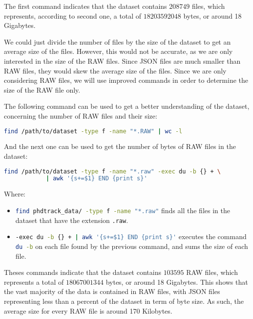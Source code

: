     The first command indicates that the dataset contains $ 208749 $ files, which represents, according to second one, a total of $ 18203592048 $ bytes, or around 18 Gigabytes.

    We could just divide the number of files by the size of the dataset to get an average size of the files. However, this would not be accurate, as we are only interested in the size of the RAW files. Since JSON files are much smaller than RAW files, they would skew the average size of the files. Since we are only considering RAW files, we will use improved commands in order to determine the size of the RAW file only.

    The following command can be used to get a better understanding of the dataset, concerning the number of RAW files and their size:

    \begin{lstlisting}[caption={Find the number of RAW files in the dataset}, language=bash]
        find /path/to/dataset -type f -name "*.RAW" | wc -l
    \end{lstlisting}

    And the next one can be used to get the number of bytes of RAW files in the dataset:

    \begin{lstlisting}[caption={Find the number of bytes of RAW files in the dataset}, language=bash]
        find /path/to/dataset -type f -name "*.raw" -exec du -b {} + \
            | awk '{s+=$1} END {print s}'
    \end{lstlisting}

    Where:
    \begin{itemize}
        \item \lstinline[language=bash]!find phdtrack_data/ -type f -name "*.raw"! finds all the files in the dataset that have the extension \lstinline[language=bash]!.raw!.
        \item \lstinline[language=bash]!-exec du -b {} + | awk '{s+=$1} END {print s}'! executes the command \lstinline[language=bash]!du -b! on each file found by the previous command, and sums the size of each file.
    \end{itemize}

    Theses commands indicate that the dataset contains $ 103595 $ RAW files, which represents a total of $ 18067001344 $ bytes, or around 18 Gigabytes. This shows that the vast majority of the data is contained in RAW files, with JSON files representing less than a percent of the dataset in term of byte size. As such, the average size for every RAW file is around 170 Kilobytes. 

